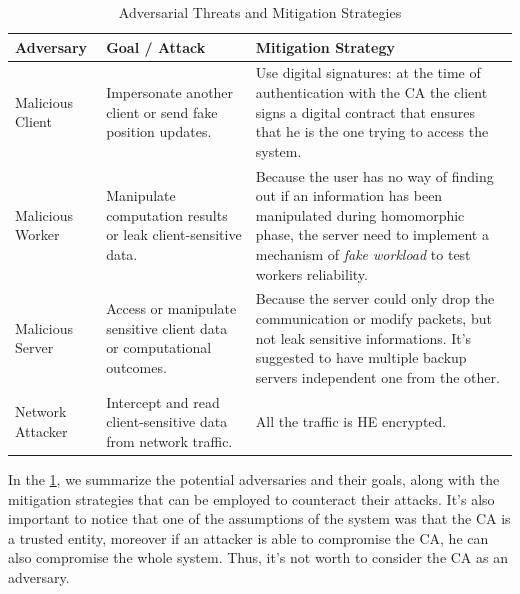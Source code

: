 \begin{table}[h]
\renewcommand{\arraystretch}{1.3}
\small
\begin{tabularx}{\linewidth}{|l|X|X|}
\hline
\textbf{Adversary} & \textbf{Goal / Attack} & \textbf{Mitigation Strategy} \\ \hline

Malicious Client &
Impersonate another client or send fake position updates. &
Use digital signatures: at the time of authentication with the CA the client signs a digital contract that ensures that he is the one trying to access the system. \\ \hline

Malicious Worker &
Manipulate computation results or leak client-sensitive data. &
Because the user has no way of finding out if an information has been manipulated during homomorphic phase, the server need to implement a mechanism of \emph{fake workload} to test workers reliability. \\ \hline

Malicious Server &
Access or manipulate sensitive client data or computational outcomes. &
Because the server could only drop the communication or modify packets, but not leak sensitive informations. It's suggested to have multiple backup servers independent one from the other. \\ \hline

Network Attacker &
Intercept and read client-sensitive data from network traffic. &
All the traffic is HE encrypted. \\ \hline

\end{tabularx}
\caption{Adversarial Threats and Mitigation Strategies}
\label{table:adversaries}
\end{table}

In the \cref{table:adversaries}, we summarize the potential adversaries and their goals, along with the mitigation strategies that can be employed to counteract their attacks. It's also important to notice that one of the assumptions of the system was that the CA is a trusted entity, moreover if an attacker is able to compromise the CA, he can also compromise the whole system. Thus, it's not worth to consider the CA as an adversary.
